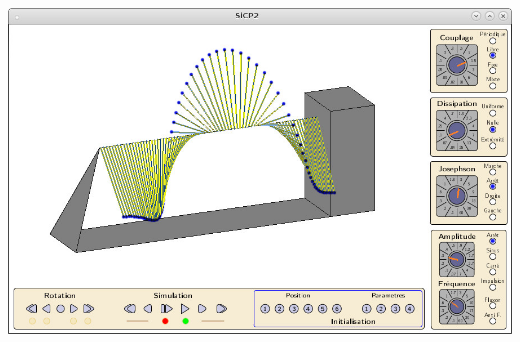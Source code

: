 \begin{titlepage}
\begin{center}

\includegraphics[width=.6\textwidth]{./illustration/SiCP2}
\label{fig:image1}
~\\[1cm]


\end{center}
\end{titlepage}
